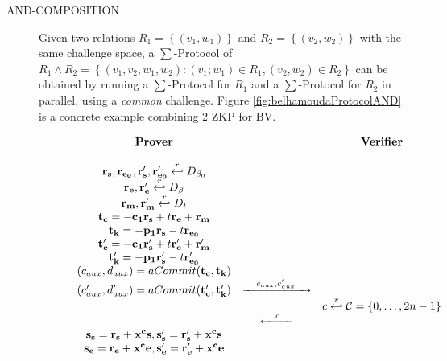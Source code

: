 \begin{description}
\item[AND-COMPOSITION] Given two relations $R_1 = \left\{ (v_1,w_1) \right\}$
  and $R_2 = \left\{ (v_2, w_2) \right\}$ with the same challenge space, a
  $\sum$-Protocol of
  $R_1 \wedge R_2 = \left\{ (v_1, v_2, w_1, w_2): (v_1;w_1) \in R_1, (v_2,w_2)
    \in R_2\right\}$ can be obtained by running a $\sum$-Protocol for $R_1$ and
  a $\sum$-Protocol for $R_2$ in parallel, using a \emph{common} challenge.
  Figure \ref{fig:belhamoudaProtocolAND} is a concrete example combining 2 ZKP for BV.
  
  \begin{figure}[h!]
    \centering
    \begin{equation*}
      \begin{array}{c c c}
        \text{\textbf{Prover}} & & \text{\textbf{Verifier}} \\
        \\
        \mathbf{r_s,r_{e_0},r'_{s},r'_{e_{0}}} \stackrel{r}{\hookleftarrow} D_{\beta_0} & & \\
        \mathbf{r_e,r'_{e}} \stackrel{r}{\hookleftarrow} D_{\beta} & & \\
        \mathbf{r_m,r'_{m}} \stackrel{r}{\hookleftarrow} D_{t} & & \\
        \mathbf{t_c} = \mathbf{-c_1r_s} + t\mathbf{r_e + r_m} & & \\
        \mathbf{t_k} = \mathbf{-p_1r_s} - t\mathbf{r_{e_0}} & & \\
        \mathbf{t'_c} = \mathbf{-c_1r'_s} + t\mathbf{r'_e + r'_m} & & \\
        \mathbf{t'_k} = \mathbf{-p_1r'_s} - t\mathbf{r'_{e_0}} & & \\
        (c_{aux}, d_{aux}) = aCommit(\mathbf{t_c,t_k}) & & \\
        (c'_{aux}, d'_{aux}) = aCommit(\mathbf{t'_c,t'_k}) &
                                                         \xrightarrow{\hspace{1em}c_{aux},c'_{aux}\hspace{1em}} & \\
                               & & c \stackrel{r}{\hookleftarrow} \mathcal{C} = \left\{ 0,\dots, 2n -1  \right\}\\
                               &  \xleftarrow{\hspace{1em}c\hspace{1em}} & \\
        \mathbf{s_s = r_s + x^cs},\mathbf{s'_s = r'_s + x^cs} & & \\
        \mathbf{s_e = r_e + x^ce},\mathbf{s'_e = r'_e + x^ce} & & \\

\end{array}
\end{equation*}
\end{figure}
\end{description}
